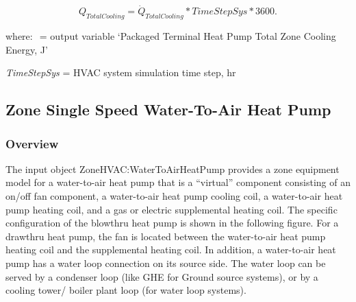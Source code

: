 \begin{equation}
{Q_{TotalCooling}} = {\dot Q_{TotalCooling}}*TimeStepSys*3600.
\end{equation}

where: \(_{ }\) = output variable `Packaged Terminal Heat Pump Total Zone Cooling Energy, J'

\emph{TimeStepSys} = HVAC system simulation time step, hr

\subsection{Zone Single Speed Water-To-Air Heat Pump}\label{zone-single-speed-water-to-air-heat-pump}

\subsubsection{Overview}\label{overview-8-001}

The input object ZoneHVAC:WaterToAirHeatPump provides a zone equipment model for a water-to-air heat pump that is a ``virtual'' component consisting of an on/off fan component, a water-to-air heat pump cooling coil, a water-to-air heat pump heating coil, and a gas or electric supplemental heating coil. The specific configuration of the blowthru heat pump is shown in the following figure. For a drawthru heat pump, the fan is located between the water-to-air heat pump heating coil and the supplemental heating coil. In addition, a water-to-air heat pump has a water loop connection on its source side. The water loop can be served by a condenser loop (like GHE for Ground source systems), or by a cooling tower/ boiler plant loop (for water loop systems).

